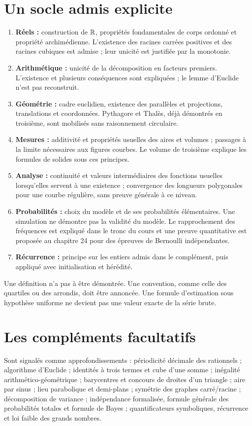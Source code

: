 \documentclass[11pt,a4paper,oneside]{book}
\begin{document}
\section{Un socle admis explicite}
\begin{enumerate}
\item \textbf{Réels :} construction de $\mathbb{R}$, propriétés fondamentales de corps ordonné et propriété archimédienne. L'existence des racines carrées positives et des racines cubiques est admise ; leur unicité est justifiée par la monotonie.
\item \textbf{Arithmétique :} unicité de la décomposition en facteurs premiers. L'existence et plusieurs conséquences sont expliquées ; le lemme d'Euclide n'est pas reconstruit.
\item \textbf{Géométrie :} cadre euclidien, existence des parallèles et projections, translations et coordonnées. Pythagore et Thalès, déjà démontrés en troisième, sont mobilisés sans raisonnement circulaire.
\item \textbf{Mesures :} additivité et propriétés usuelles des aires et volumes ; passages à la limite nécessaires aux figures courbes. Le volume de troisième explique les formules de solides sous ces principes.
\item \textbf{Analyse :} continuité et valeurs intermédiaires des fonctions usuelles lorsqu'elles servent à une existence ; convergence des longueurs polygonales pour une courbe régulière, sans preuve générale à ce niveau.
\item \textbf{Probabilités :} choix du modèle et de ses probabilités élémentaires. Une simulation ne démontre pas la validité du modèle. Le rapprochement des fréquences est expliqué dans le tronc du cours et une preuve quantitative est proposée au chapitre 24 pour des épreuves de Bernoulli indépendantes.
\item \textbf{Récurrence :} principe sur les entiers admis dans le complément, puis appliqué avec initialisation et hérédité.
\end{enumerate}
Une définition n'a pas à être démontrée. Une convention, comme celle des quartiles ou des arrondis, doit être annoncée. Une formule d'estimation sous hypothèse uniforme ne devient pas une valeur exacte de la série brute.
\section{Les compléments facultatifs}
Sont signalés comme approfondissements : périodicité décimale des rationnels ; algorithme d'Euclide ; identités à trois termes et cube d'une somme ; inégalité arithmético-géométrique ; barycentres et concours de droites d'un triangle ; aire par sinus ; lieu parabolique et demi-plans ; symétrie des graphes carré/racine ; décomposition de variance ; indépendance formalisée, formule générale des probabilités totales et formule de Bayes ; quantificateurs symboliques, récurrence et loi faible des grands nombres.
\end{document}
